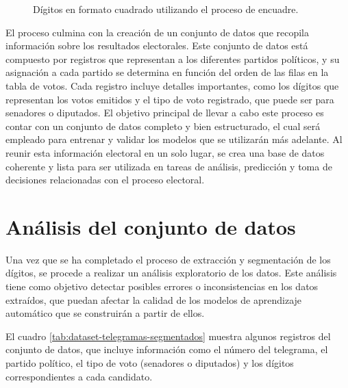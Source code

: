 \begin{figure}[H]
    \centering
    \caption[Dígitos en formato cuadrado]{Dígitos en formato cuadrado utilizando el proceso de encuadre.}
    \label{fig:etl-4-digitos-cuadrados}
\end{figure}

El proceso culmina con la creación de un conjunto de datos que recopila información sobre los resultados electorales.
Este conjunto de datos está compuesto por registros que representan a los diferentes partidos políticos, y su
asignación a cada partido se determina en función del orden de las filas en la tabla de votos. Cada registro incluye
detalles importantes, como los dígitos que representan los votos emitidos y el tipo de voto registrado, que puede ser
para senadores o diputados. El objetivo principal de llevar a cabo este proceso es contar con un conjunto de datos
completo y bien estructurado, el cual será empleado para entrenar y validar los modelos que se utilizarán más adelante.
Al reunir esta información electoral en un solo lugar, se crea una base de datos coherente y lista para ser utilizada
en tareas de análisis, predicción y toma de decisiones relacionadas con el proceso electoral.

\section{Análisis del conjunto de datos}

Una vez que se ha completado el proceso de extracción y segmentación de los dígitos, se procede a realizar un análisis
exploratorio de los datos. Este análisis tiene como objetivo detectar posibles errores o inconsistencias en los datos
extraídos, que puedan afectar la calidad de los modelos de aprendizaje automático que se construirán a partir de ellos.

El cuadro \ref{tab:dataset-telegramas-segmentados} muestra algunos registros del conjunto de datos, que incluye
información como el número del telegrama, el partido político, el tipo de voto (senadores o diputados) y los dígitos
correspondientes a cada candidato.

